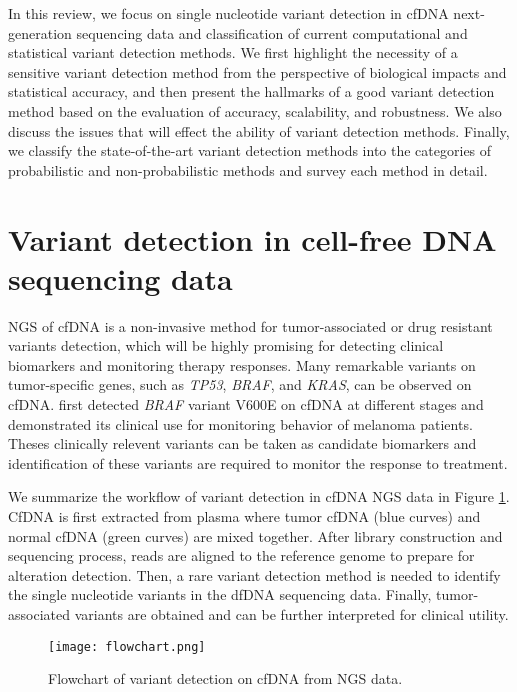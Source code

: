 \documentclass[11pt,reqno]{amsart}
\begin{document}
In this review, we focus on single nucleotide variant detection in cfDNA next-generation sequencing data and classification of current computational and statistical variant detection methods.
We first highlight the necessity of a sensitive variant detection method from the perspective of biological impacts and statistical accuracy,
and then present the hallmarks of a good variant detection method based on the evaluation of accuracy, scalability, and robustness.
We also discuss the issues that will effect the ability of variant detection methods.
Finally, we classify the state-of-the-art variant detection methods into the categories of probabilistic and non-probabilistic methods and survey each method in detail.


\section{Variant detection in cell-free DNA sequencing data}

NGS of cfDNA is a non-invasive method for tumor-associated or drug resistant variants detection, which will be highly promising for detecting clinical biomarkers and monitoring therapy responses. 
Many remarkable variants on tumor-specific genes, such as \textit{TP53}, \textit{BRAF}, and \textit{KRAS}, can be observed on cfDNA.
\citet{shinozaki2007utility} first detected \textit{BRAF} variant V600E on cfDNA at different stages and demonstrated its clinical use for monitoring behavior of melanoma patients.
Theses clinically relevent variants can be taken as candidate biomarkers and identification of these variants are required to monitor the response to treatment.

We summarize the workflow of variant detection in cfDNA NGS data in Figure \ref{fig:flowchart}.
CfDNA is first extracted from plasma where tumor cfDNA (blue curves) and normal cfDNA (green curves) are mixed together.
After library construction and sequencing process, reads are aligned to the reference genome to prepare for alteration detection.
Then, a rare variant detection method is needed to identify the single nucleotide variants in the dfDNA sequencing data.
Finally, tumor-associated variants are obtained and can be further interpreted for clinical utility.


\begin{figure}[htbp]
\centering
\texttt{[image: flowchart.png]}
\caption{Flowchart of variant detection on cfDNA from NGS data.}
\label{fig:flowchart}
\end{figure}
\end{document}
